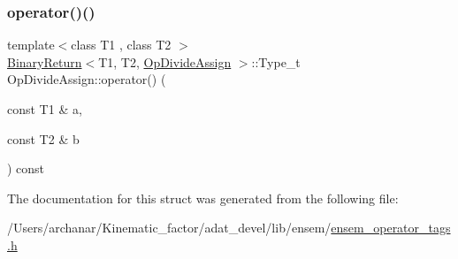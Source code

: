 \mbox{\label{structOpDivideAssign_a805531d103a9b37b9eb9ff4debaf5e41}} 
\subsubsection{\texorpdfstring{operator()()}{operator()()}\hspace{0.1cm}{\footnotesize\ttfamily [2/2]}}
{\footnotesize\ttfamily template$<$class T1 , class T2 $>$ \\
\mbox{\hyperlink{structBinaryReturn}{Binary\+Return}}$<$T1, T2, \mbox{\hyperlink{structOpDivideAssign}{Op\+Divide\+Assign}} $>$\+::Type\+\_\+t Op\+Divide\+Assign\+::operator() (\begin{DoxyParamCaption}\item[{const T1 \&}]{a,  }\item[{const T2 \&}]{b }\end{DoxyParamCaption}) const\hspace{0.3cm}{\ttfamily [inline]}}



The documentation for this struct was generated from the following file\+:\begin{DoxyCompactItemize}
\item 
/\+Users/archanar/\+Kinematic\+\_\+factor/adat\+\_\+devel/lib/ensem/\mbox{\hyperlink{lib_2ensem_2ensem__operator__tags_8h}{ensem\+\_\+operator\+\_\+tags.\+h}}\end{DoxyCompactItemize}
